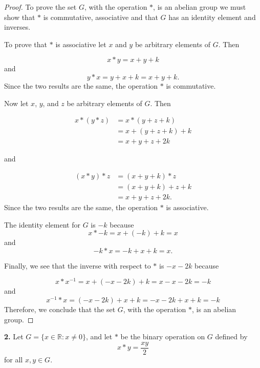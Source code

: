 \documentclass[12pt]{article}   %
\begin{document}
\begin{proof}
To prove the set $G$, with the operation $\ast$, is an abelian group we must show that $\ast$ is commutative, associative and that $G$ has an identity element and inverses.

To prove that $*$ is associative let $x$ and $y$ be arbitrary elements of $G$. Then

\begin{equation*}
x * y = x + y + k
\end{equation*}
and
\[
y * x = y + x + k = x + y + k.
\]
Since the two results are the same, the operation $\ast$ is commutative.

Now let $x$, $y$, and $z$ be arbitrary elements of $G$. Then

\begin{align*}
x * (y * z) &= x * (y + z + k) \\
&= x + (y + z + k) + k \\
&= x + y + z + 2k
\end{align*}

and

\begin{align*}
(x * y) * z &= (x + y + k) * z \\
&= (x + y + k) + z + k \\
&= x + y + z + 2k.
\end{align*}
Since the two results are the same, the operation $*$ is associative.


The identity element for $G$ is $-k$ because
\begin{equation*}
x * -k = x + (-k) + k = x
\end{equation*}
and
\begin{equation*}
-k * x = -k + x + k = x.
\end{equation*}

Finally, we see that the inverse with respect to $*$ is $-x - 2k$ because

\begin{equation*}
x * x^{-1} = x + (-x - 2k) + k = x - x - 2k = -k
\end{equation*}
and
\begin{equation*}
x^{-1} * x = (-x - 2k) + x + k = -x - 2k + x + k = -k
\end{equation*}
Therefore, we conclude that the set $G$, with the operation $\ast$, is an abelian group.
\end{proof}

\noindent\textbf{2.} \quad Let $G = \{x \in \mathbb{R}: x \neq 0\}$, and let $\ast$ be the binary operation on $G$ defined by
\begin{equation}
x * y = \frac{xy}{2}
\end{equation}
for all $x, y \in G$.
\end{document}
